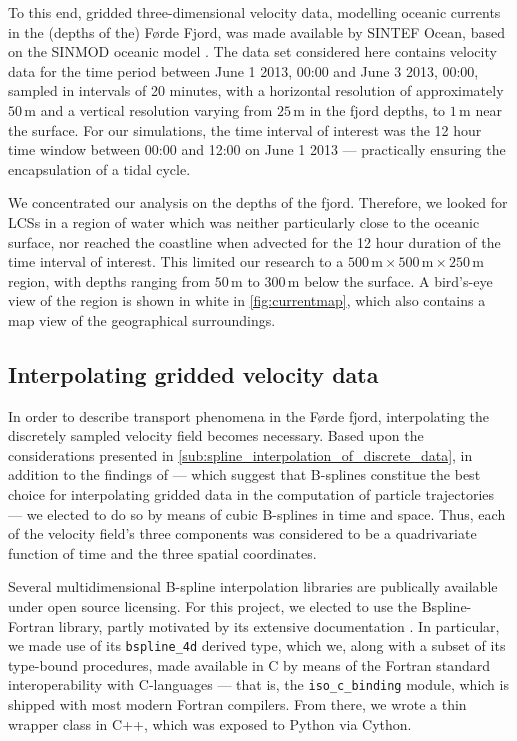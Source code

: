 To this end, gridded three-dimensional velocity data, modelling oceanic
currents in the (depths of the) Førde Fjord, was made available by SINTEF
Ocean, based on the SINMOD oceanic model \parencite{slagstad2005modeling}. The
data set considered here contains velocity data for the time period between
June 1 2013, 00:00 and June 3 2013, 00:00, sampled in intervals of 20 minutes,
with a horizontal resolution of approximately $50\,\si{\meter}$ and a
vertical resolution varying from $25\,\si{\meter}$ in the fjord depths, to
$1\,\si{\meter}$ near the surface. For our simulations, the time interval of
interest was the 12 hour time window between 00:00 and 12:00 on June 1 2013 ---
practically ensuring the encapsulation of a tidal cycle.

We concentrated our analysis on the depths of the fjord. Therefore, we looked
for LCSs in a region of water which was neither particularly close to the
oceanic surface, nor reached the coastline when advected for the 12 hour
duration of the time interval of interest. This limited our research to a
$500\,\si{\meter}\times500\,\si{\meter}\times250\,\si{\meter}$ region, with
depths ranging from $50\,\si{\meter}$ to $300\,\si{\meter}$ below the
surface. A bird's-eye view of the region is shown in white in
\cref{fig:currentmap}, which also contains a map view of the geographical
surroundings.



\subsection{Interpolating gridded velocity data}
\label{sub:interpolating_gridded_velocity_data}

In order to describe transport phenomena in the Førde fjord, interpolating
the discretely sampled velocity field becomes necessary. Based upon the
considerations presented in \cref{sub:spline_interpolation_of_discrete_data},
in addition to the findings of \textcite{vanhinsberg2013optimal} --- which
suggest that B-splines constitue the best choice for interpolating gridded data
in the computation of particle trajectories --- we elected to do so by means of
cubic B-splines in time and space. Thus, each of the velocity field's three
components was considered to be a quadrivariate function of time and the three
spatial coordinates.

Several multidimensional B-spline interpolation libraries are publically
available under open source licensing. For this project, we elected to use
the Bspline-Fortran library, partly motivated by its extensive documentation
\parencite{williams2018bspline}. In particular, we made use of its
\texttt{bspline\_4d} derived type, which we, along with a subset of its
type-bound procedures, made available in C by means of the Fortran standard
interoperability with C-languages --- that is, the \texttt{iso\_c\_binding}
module, which is shipped with most modern Fortran compilers. From there,
we wrote a thin wrapper class in C++, which was exposed to Python via Cython.

